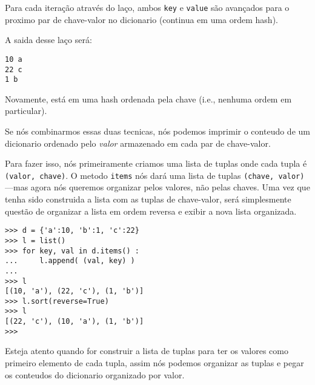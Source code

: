 Para cada iteração
através do laço, ambos {\tt key} e {\tt value} são avançados para o
proximo par de chave-valor no dicionario (continua em uma ordem hash).

A saida desse laço será:

\beforeverb
\begin{verbatim}
10 a
22 c
1 b
\end{verbatim}
\afterverb
%
Novamente, está em uma hash ordenada pela chave (i.e., nenhuma ordem em particular).

Se nós combinarmos essas duas tecnicas, nós podemos imprimir o conteudo
de um dicionario ordenado pelo \emph{valor} armazenado em cada par de 
chave-valor.

Para fazer isso, nós primeiramente criamos uma lista de tuplas onde cada tupla é
{\tt (valor, chave)}. O metodo {\tt items} nós dará uma lista de tuplas 
{\tt (chave, valor)} ---mas agora nós queremos organizar pelos valores, não pelas chaves.
Uma vez que tenha sido construida a lista com as tuplas de chave-valor, será
simplesmente questão de organizar a lista em ordem reversa e exibir a nova 
lista organizada.

\beforeverb
\begin{verbatim}
>>> d = {'a':10, 'b':1, 'c':22}
>>> l = list()
>>> for key, val in d.items() :
...     l.append( (val, key) )
... 
>>> l
[(10, 'a'), (22, 'c'), (1, 'b')]
>>> l.sort(reverse=True)
>>> l
[(22, 'c'), (10, 'a'), (1, 'b')]
>>> 
\end{verbatim}
\afterverb
%
Esteja atento quando for construir a lista de tuplas para ter os valores como
primeiro elemento de cada tupla, assim nós podemos organizar as tuplas e pegar os
conteudos do dicionario organizado por valor.

